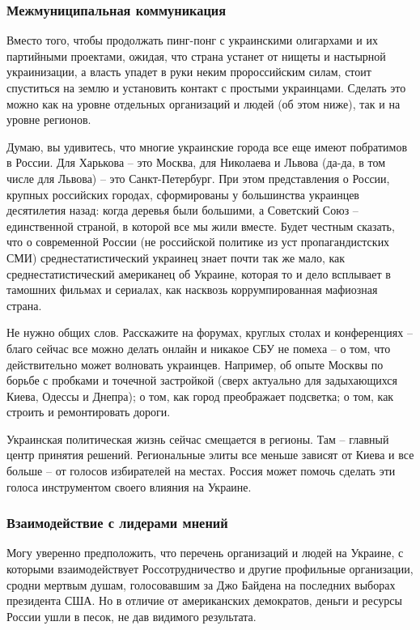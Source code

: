 \subsubsection{Межмуниципальная коммуникация}

Вместо того, чтобы продолжать пинг-понг с украинскими олигархами и их
партийными проектами, ожидая, что страна устанет от нищеты и настырной
украинизации, а власть упадет в руки неким пророссийским силам, стоит
спуститься на землю и установить контакт с простыми украинцами. Сделать это
можно как на уровне отдельных организаций и людей (об этом ниже), так и на
уровне регионов.

Думаю, вы удивитесь, что многие украинские города все еще имеют побратимов в
России. Для Харькова – это Москва, для Николаева и Львова (да-да, в том числе
для Львова) – это Санкт-Петербург. При этом представления о России, крупных
российских городах, сформированы у большинства украинцев десятилетия назад:
когда деревья были большими, а Советский Союз – единственной страной, в которой
все мы жили вместе. Будет честным сказать, что о современной России (не
российской политике из уст пропагандистских СМИ) среднестатистический украинец
знает почти так же мало, как среднестатистический американец об Украине,
которая то и дело всплывает в тамошних фильмах и сериалах, как насквозь
коррумпированная мафиозная страна. 

Не нужно общих слов. Расскажите на форумах, круглых столах и конференциях –
благо сейчас все можно делать онлайн и никакое СБУ не помеха – о том, что
действительно может волновать украинцев. Например, об опыте Москвы по борьбе с
пробками и точечной застройкой (сверх актуально для задыхающихся Киева, Одессы
и Днепра); о том, как город преображает подсветка; о том, как строить и
ремонтировать дороги.

Украинская политическая жизнь сейчас смещается в регионы. Там – главный центр
принятия решений. Региональные элиты все меньше зависят от Киева и все больше –
от голосов избирателей на местах. Россия может помочь сделать эти голоса
инструментом своего влияния на Украине. 

\subsubsection{Взаимодействие с лидерами мнений}

Могу уверенно предположить, что перечень организаций и людей на Украине, с
которыми взаимодействует Россотрудничество и другие профильные организации,
сродни мертвым душам, голосовавшим за Джо Байдена на последних выборах
президента США. Но в отличие от американских демократов, деньги и ресурсы
России ушли в песок, не дав видимого результата.


